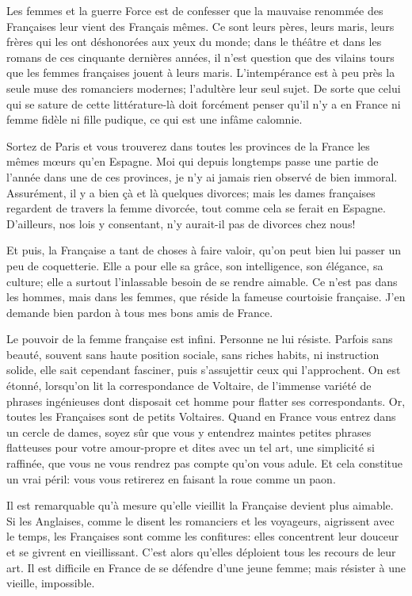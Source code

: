 \begin{chapter}{Les femmes et la guerre}
Force est de confesser que la mauvaise renommée des Françaises leur
vient des Français mêmes. Ce sont leurs pères, leurs maris, leurs frères
qui les ont déshonorées aux yeux du monde; dans le théâtre et dans les
romans de ces cinquante dernières années, il n'est question que des
vilains tours que les femmes françaises jouent à leurs maris.
L'intempérance est à peu près la seule muse des romanciers modernes;
l'adultère leur seul sujet. De sorte que celui qui se sature de cette
littérature-là doit forcément penser qu'il n'y a en France ni femme
fidèle ni fille pudique, ce qui est une infâme calomnie.

Sortez de Paris et vous trouverez dans toutes les provinces de la France
les mêmes mœurs qu'en Espagne. Moi qui depuis longtemps passe une
partie de l'année dans une de ces provinces, je n'y ai jamais rien
observé de bien immoral. Assurément, il y a bien çà et là quelques
divorces; mais les dames françaises regardent de travers la femme
divorcée, tout comme cela se ferait en Espagne. D'ailleurs, nos lois y
consentant, n'y aurait-il pas de divorces chez nous!

Et puis, la Française a tant de choses à faire valoir, qu'on peut bien
lui passer un peu de coquetterie. Elle a pour elle sa grâce, son
intelligence, son élégance, sa culture; elle a surtout l'inlassable
besoin de se rendre aimable. Ce n'est pas dans les hommes, mais dans les
femmes, que réside la fameuse courtoisie française. J'en demande bien
pardon à tous mes bons amis de France.

Le pouvoir de la femme française est infini. Personne ne lui résiste.
Parfois sans beauté, souvent sans haute position sociale, sans riches
habits, ni instruction solide, elle sait cependant fasciner, puis
s'assujettir ceux qui l'approchent. On est étonné, lorsqu'on lit la
correspondance de Voltaire, de l'immense variété de phrases ingénieuses
dont disposait cet homme pour flatter ses correspondants. Or, toutes les
Françaises sont de petits Voltaires. Quand en France vous entrez dans un
cercle de dames, soyez sûr que vous y entendrez maintes petites phrases
flatteuses pour votre amour-propre et dites avec un tel art, une
simplicité si raffinée, que vous ne vous rendrez pas compte qu'on vous
adule. Et cela constitue un vrai péril: vous vous retirerez en faisant
la roue comme un paon.

Il est remarquable qu'à mesure qu'elle vieillit la Française devient
plus aimable. Si les Anglaises, comme le disent les romanciers et les
voyageurs, aigrissent avec le temps, les Françaises sont comme les
confitures: elles concentrent leur douceur et se givrent en
vieillissant. C'est alors qu'elles déploient tous les recours de leur
art. Il est difficile en France de se défendre d'une jeune femme; mais
résister à une vieille, impossible.


\end{chapter}
